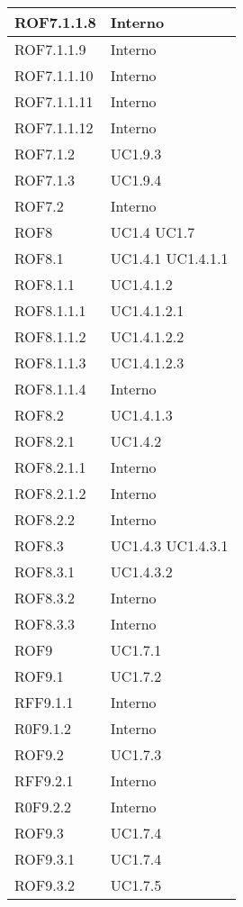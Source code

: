 \begin{center}
\begin{longtable}{| p{4cm} | p{4cm} |}
\hline
ROF7.1.1.8   &  Interno \\
\hline
ROF7.1.1.9   &  Interno \\
\hline
ROF7.1.1.10   &  Interno \\
\hline
ROF7.1.1.11   &  Interno \\
\hline
ROF7.1.1.12   &  Interno \\
\hline
ROF7.1.2   &  UC1.9.3  \\
\hline
ROF7.1.3   &  UC1.9.4  \\
\hline
ROF7.2   &  Interno \\
\hline
ROF8   &  UC1.4 \newline UC1.7 \\
\hline
ROF8.1   &  UC1.4.1 \newline UC1.4.1.1 \\
\hline
ROF8.1.1   &  UC1.4.1.2 \\
\hline
ROF8.1.1.1   &  UC1.4.1.2.1 \\
\hline
ROF8.1.1.2   &  UC1.4.1.2.2 \\
\hline
ROF8.1.1.3   &  UC1.4.1.2.3 \\
\hline
ROF8.1.1.4   &  Interno \\
\hline
ROF8.2   &  UC1.4.1.3 \\
\hline
ROF8.2.1   &  UC1.4.2 \\
\hline
ROF8.2.1.1   &  Interno \\
\hline
ROF8.2.1.2   &  Interno \\
\hline
ROF8.2.2   &  Interno \\
\hline
ROF8.3   &  UC1.4.3 \newline UC1.4.3.1  \\
\hline
ROF8.3.1   &  UC1.4.3.2 \\
\hline
ROF8.3.2   &  Interno \\
\hline
ROF8.3.3   &  Interno \\
\hline
ROF9   &  UC1.7.1 \\
\hline
ROF9.1   &  UC1.7.2 \\
\hline
RFF9.1.1   &  Interno \\
\hline
R0F9.1.2   &  Interno \\
\hline
ROF9.2   &  UC1.7.3 \\
\hline
RFF9.2.1   &  Interno \\
\hline
R0F9.2.2   &  Interno \\
\hline
ROF9.3   &  UC1.7.4 \\
\hline
ROF9.3.1   &  UC1.7.4 \\
\hline
ROF9.3.2   &  UC1.7.5 \\

\end{longtable}
\end{center}

